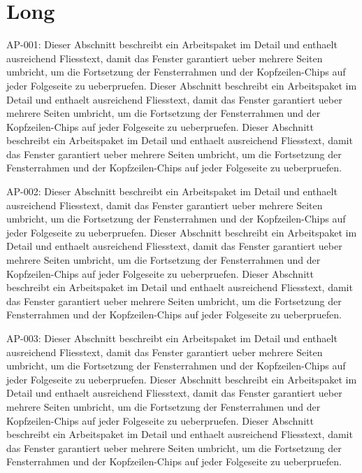 \documentclass[type=report,theme=dark,language=de]{semio}
\begin{document}
\chapter{Long}
\begin{Table}[title=Lange Tabelle]
AP-001: Dieser Abschnitt beschreibt ein Arbeitspaket im Detail und enthaelt ausreichend Fliesstext, damit das Fenster garantiert ueber mehrere Seiten umbricht, um die Fortsetzung der Fensterrahmen und der Kopfzeilen-Chips auf jeder Folgeseite zu ueberpruefen. Dieser Abschnitt beschreibt ein Arbeitspaket im Detail und enthaelt ausreichend Fliesstext, damit das Fenster garantiert ueber mehrere Seiten umbricht, um die Fortsetzung der Fensterrahmen und der Kopfzeilen-Chips auf jeder Folgeseite zu ueberpruefen. Dieser Abschnitt beschreibt ein Arbeitspaket im Detail und enthaelt ausreichend Fliesstext, damit das Fenster garantiert ueber mehrere Seiten umbricht, um die Fortsetzung der Fensterrahmen und der Kopfzeilen-Chips auf jeder Folgeseite zu ueberpruefen. 

AP-002: Dieser Abschnitt beschreibt ein Arbeitspaket im Detail und enthaelt ausreichend Fliesstext, damit das Fenster garantiert ueber mehrere Seiten umbricht, um die Fortsetzung der Fensterrahmen und der Kopfzeilen-Chips auf jeder Folgeseite zu ueberpruefen. Dieser Abschnitt beschreibt ein Arbeitspaket im Detail und enthaelt ausreichend Fliesstext, damit das Fenster garantiert ueber mehrere Seiten umbricht, um die Fortsetzung der Fensterrahmen und der Kopfzeilen-Chips auf jeder Folgeseite zu ueberpruefen. Dieser Abschnitt beschreibt ein Arbeitspaket im Detail und enthaelt ausreichend Fliesstext, damit das Fenster garantiert ueber mehrere Seiten umbricht, um die Fortsetzung der Fensterrahmen und der Kopfzeilen-Chips auf jeder Folgeseite zu ueberpruefen. 

AP-003: Dieser Abschnitt beschreibt ein Arbeitspaket im Detail und enthaelt ausreichend Fliesstext, damit das Fenster garantiert ueber mehrere Seiten umbricht, um die Fortsetzung der Fensterrahmen und der Kopfzeilen-Chips auf jeder Folgeseite zu ueberpruefen. Dieser Abschnitt beschreibt ein Arbeitspaket im Detail und enthaelt ausreichend Fliesstext, damit das Fenster garantiert ueber mehrere Seiten umbricht, um die Fortsetzung der Fensterrahmen und der Kopfzeilen-Chips auf jeder Folgeseite zu ueberpruefen. Dieser Abschnitt beschreibt ein Arbeitspaket im Detail und enthaelt ausreichend Fliesstext, damit das Fenster garantiert ueber mehrere Seiten umbricht, um die Fortsetzung der Fensterrahmen und der Kopfzeilen-Chips auf jeder Folgeseite zu ueberpruefen. 


\end{Table}
\end{document}
